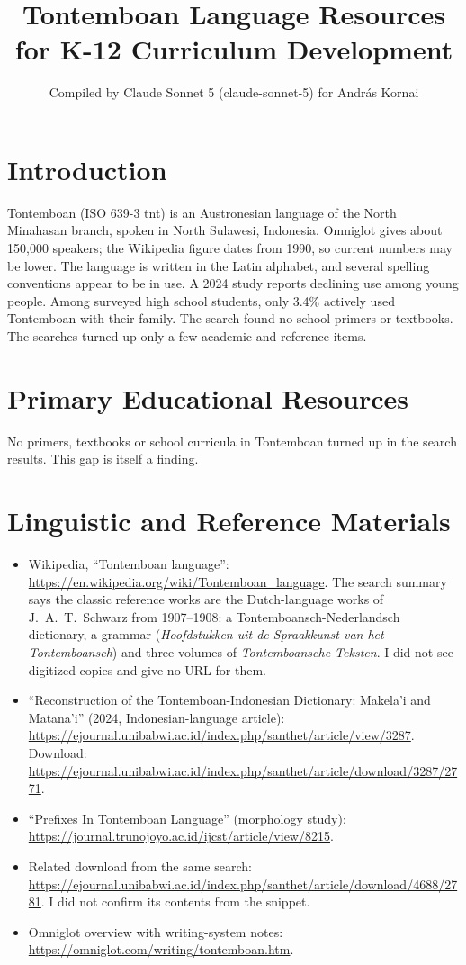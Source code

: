 \documentclass[12pt]{article}
\title{Tontemboan Language Resources for K-12 Curriculum Development}
\author{Compiled by Claude Sonnet 5 (claude-sonnet-5) for Andr\'as Kornai}
\date{}
\begin{document}
\maketitle

\section{Introduction}
Tontemboan (ISO 639-3 tnt) is an Austronesian language of the North Minahasan branch, spoken in North Sulawesi, Indonesia. Omniglot gives about 150,000 speakers; the Wikipedia figure dates from 1990, so current numbers may be lower. The language is written in the Latin alphabet, and several spelling conventions appear to be in use. A 2024 study reports declining use among young people. Among surveyed high school students, only 3.4\% actively used Tontemboan with their family. The search found no school primers or textbooks. The searches turned up only a few academic and reference items.

\section{Primary Educational Resources}
No primers, textbooks or school curricula in Tontemboan turned up in the search results. This gap is itself a finding.

\section{Linguistic and Reference Materials}
\begin{itemize}
\item Wikipedia, ``Tontemboan language'': \url{https://en.wikipedia.org/wiki/Tontemboan_language}. The search summary says the classic reference works are the Dutch-language works of J.\ A.\ T.\ Schwarz from 1907--1908: a Tontemboansch-Nederlandsch dictionary, a grammar (\emph{Hoofdstukken uit de Spraakkunst van het Tontemboansch}) and three volumes of \emph{Tontemboansche Teksten}. I did not see digitized copies and give no URL for them.
\item ``Reconstruction of the Tontemboan-Indonesian Dictionary: Makela'i and Matana'i'' (2024, Indonesian-language article): \url{https://ejournal.unibabwi.ac.id/index.php/santhet/article/view/3287}. Download: \url{https://ejournal.unibabwi.ac.id/index.php/santhet/article/download/3287/2771}.
\item ``Prefixes In Tontemboan Language'' (morphology study): \url{https://journal.trunojoyo.ac.id/ijcst/article/view/8215}.
\item Related download from the same search: \url{https://ejournal.unibabwi.ac.id/index.php/santhet/article/download/4688/2781}. I did not confirm its contents from the snippet.
\item Omniglot overview with writing-system notes: \url{https://omniglot.com/writing/tontemboan.htm}.
\end{itemize}
\end{document}
